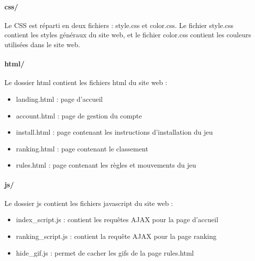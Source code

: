 \documentclass[12pt, openany]{article}
\begin{document}
	\paragraph {css/}
	Le CSS est réparti en deux fichiers : style.css et color.css. Le fichier style.css contient les styles généraux du site web, et le fichier color.css contient les couleurs utilisées dans le site web.

	\paragraph {html/}
	Le dossier html contient les fichiers html du site web :
	\begin{itemize}[label=$-$]
		\item landing.html : page d'accueil\\
		\item account.html : page de gestion du compte\\
		\item install.html : page contenant les instructions d'installation du jeu\\
		\item ranking.html : page contenant le classement\\
		\item rules.html : page contenant les règles et mouvements du jeu\\
	\end{itemize}

	\paragraph {js/}
	Le dossier js contient les fichiers javascript du site web :
	\begin{itemize}[label=$-$]
		\item index\_script.js : contient les requêtes AJAX pour la page d'accueil\\
		\item ranking\_script.js : contient la requête AJAX pour la page ranking\\
		\item hide\_gif.js : permet de cacher les gifs de la page rules.html\\
	\end{itemize}
\end{document}
